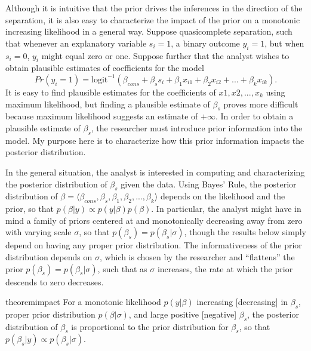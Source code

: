\documentclass[12pt]{article}
\begin{document}
Although it is intuitive that the prior drives the inferences in the direction of the separation, it is also easy to characterize the impact of the prior on a monotonic increasing likelihood in a general way. Suppose quasicomplete separation, such that whenever an explanatory variable $s_i = 1$, a binary outcome $y_i = 1$, but when $s_i = 0$, $y_i$ might equal zero or one. Suppose further that the analyst wishes to obtain plausible estimates of coefficients for the model
\begin{equation*}
Pr(y_i =1) = \text{logit}^{-1}(\beta_{cons} + \beta_s s_i +  \beta_1 x_{i1} + \beta_2 x_{i2} + ... + \beta_k x_{ik}). 
\end{equation*}
\noindent It is easy to find plausible estimates for the coefficients of $x1, x2, ..., x_k$ using maximum likelihood, but finding a plausible estimate of $\beta_{s}$ proves more difficult because maximum likelihood suggests an estimate of $+\infty$. In order to obtain a plausible estimate of $\beta_{s}$, the researcher must introduce prior information into the model. My purpose here is to characterize how this prior information impacts the posterior distribution.

In the general situation, the analyst is interested in computing and characterizing the posterior distribution of $\beta_s$ given the data. Using Bayes' Rule, the posterior distribution of $\beta = \langle \beta_{cons}, \beta_{s}, \beta_1, \beta_2, ..., \beta_k \rangle$ depends on the likelihood and the prior, so that $p(\beta | y) \propto p(y|\beta)p(\beta)$. In particular, the analyst might have in mind a family of priors centered at and monotonically decreasing away from zero with varying scale $\sigma$, so that $p(\beta_s) = p(\beta_s | \sigma)$, though the results below simply depend on having any proper prior distribution. The informativeness of the prior distribution depends on $\sigma$, which is chosen by the researcher and ``flattens'' the prior $p(\beta_s) = p(\beta_s | \sigma)$, such that as $\sigma$ increases, the rate at which the prior descends to zero decreases.

\begin{restatable}{theorem}{impact}\label{thm:impact}
For a monotonic likelihood $p(y | \beta)$ increasing [decreasing] in $\beta_s$, proper prior distribution $p(\beta | \sigma)$, and large positive [negative] $\beta_s$, the posterior distribution of $\beta_s$ is proportional to the prior distribution for $\beta_s$, so that $p(\beta_s | y) \propto p(\beta_s | \sigma)$.
\end{restatable}
\end{document}
